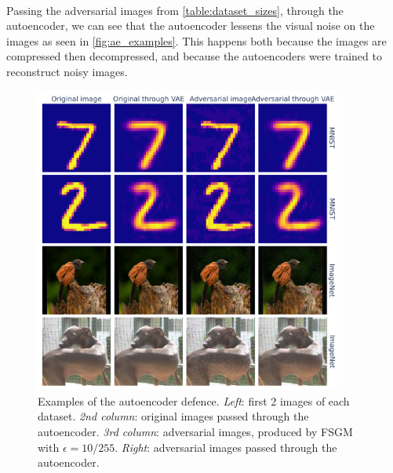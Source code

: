 \documentclass[]{scrarticle}
\renewcommand{\todo}[1]{}
\begin{document}
\todo{Maybe add a plot for the distance between latent representations of clean vs adversarial}



\paragraph{}
Passing the adversarial images from \autoref{table:dataset_sizes},
through the autoencoder, we can see that the autoencoder
lessens the visual noise on the images as seen in \autoref{fig:ae_examples}.
This happens both because the images are compressed then decompressed,
and because the autoencoders were trained to reconstruct noisy images.

\begin{figure}[h]
  \centering
  \includegraphics[width=0.9\textwidth]{../images/ae_examples.png}
  \caption{
    Examples of the autoencoder defence.
    \emph{Left}: first 2 images of each dataset.
    \emph{2nd column}: original images passed through the autoencoder.
    \emph{3rd column}: adversarial images, produced by FSGM with $\epsilon = 10/ 255$.
    \emph{Right}: adversarial images passed through the autoencoder.
  }
  \label{fig:ae_examples}
\end{figure}
\end{document}
